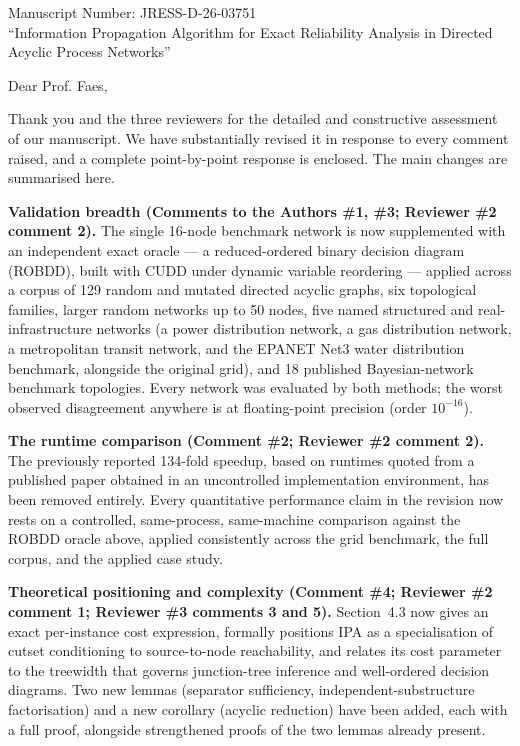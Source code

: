 \documentclass[11pt]{article}
\title{}
\date{}
\begin{document}
\noindent Manuscript Number: JRESS-D-26-03751\\
``Information Propagation Algorithm for Exact Reliability Analysis in Directed Acyclic Process Networks''

\bigskip
\noindent Dear Prof. Faes,

Thank you and the three reviewers for the detailed and constructive assessment of our manuscript. We have substantially revised it in response to every comment raised, and a complete point-by-point response is enclosed. The main changes are summarised here.

\textbf{Validation breadth (Comments to the Authors \#1, \#3; Reviewer \#2 comment 2).} The single 16-node benchmark network is now supplemented with an independent exact oracle --- a reduced-ordered binary decision diagram (ROBDD), built with CUDD under dynamic variable reordering --- applied across a corpus of 129 random and mutated directed acyclic graphs, six topological families, larger random networks up to 50 nodes, five named structured and real-infrastructure networks (a power distribution network, a gas distribution network, a metropolitan transit network, and the EPANET Net3 water distribution benchmark, alongside the original grid), and 18 published Bayesian-network benchmark topologies. Every network was evaluated by both methods; the worst observed disagreement anywhere is at floating-point precision (order $10^{-16}$).

\textbf{The runtime comparison (Comment \#2; Reviewer \#2 comment 2).} The previously reported 134-fold speedup, based on runtimes quoted from a published paper obtained in an uncontrolled implementation environment, has been removed entirely. Every quantitative performance claim in the revision now rests on a controlled, same-process, same-machine comparison against the ROBDD oracle above, applied consistently across the grid benchmark, the full corpus, and the applied case study.

\textbf{Theoretical positioning and complexity (Comment \#4; Reviewer \#2 comment 1; Reviewer \#3 comments 3 and 5).} Section~4.3 now gives an exact per-instance cost expression, formally positions IPA as a specialisation of cutset conditioning to source-to-node reachability, and relates its cost parameter to the treewidth that governs junction-tree inference and well-ordered decision diagrams. Two new lemmas (separator sufficiency, independent-substructure factorisation) and a new corollary (acyclic reduction) have been added, each with a full proof, alongside strengthened proofs of the two lemmas already present.
\end{document}

